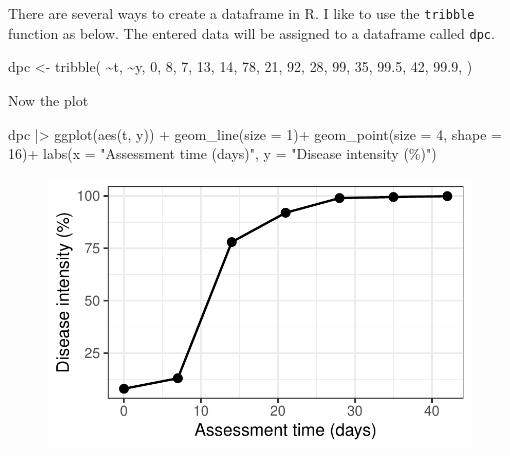 \documentclass[
  letterpaper,
  DIV=11,
  numbers=noendperiod]{scrreprt}
\newenvironment{Shaded}{\begin{snugshade}}{\end{snugshade}}
\newcommand{\AttributeTok}[1]{\textcolor[rgb]{0.40,0.45,0.13}{#1}}
\newcommand{\DecValTok}[1]{\textcolor[rgb]{0.68,0.00,0.00}{#1}}
\newcommand{\FloatTok}[1]{\textcolor[rgb]{0.68,0.00,0.00}{#1}}
\newcommand{\FunctionTok}[1]{\textcolor[rgb]{0.28,0.35,0.67}{#1}}
\newcommand{\NormalTok}[1]{\textcolor[rgb]{0.00,0.23,0.31}{#1}}
\newcommand{\OtherTok}[1]{\textcolor[rgb]{0.00,0.23,0.31}{#1}}
\newcommand{\SpecialCharTok}[1]{\textcolor[rgb]{0.37,0.37,0.37}{#1}}
\newcommand{\StringTok}[1]{\textcolor[rgb]{0.13,0.47,0.30}{#1}}
\begin{document}
There are several ways to create a dataframe in R. I like to use the
\texttt{tribble} function as below. The entered data will be assigned to
a dataframe called \texttt{dpc}.

\begin{Shaded}
\begin{Highlighting}[]
\NormalTok{dpc }\OtherTok{\textless{}{-}} 
  \FunctionTok{tribble}\NormalTok{(}
   \SpecialCharTok{\textasciitilde{}}\NormalTok{t,  }\SpecialCharTok{\textasciitilde{}}\NormalTok{y, }
   \DecValTok{0}\NormalTok{,  }\DecValTok{8}\NormalTok{, }
   \DecValTok{7}\NormalTok{,  }\DecValTok{13}\NormalTok{, }
  \DecValTok{14}\NormalTok{,  }\DecValTok{78}\NormalTok{, }
  \DecValTok{21}\NormalTok{,  }\DecValTok{92}\NormalTok{, }
  \DecValTok{28}\NormalTok{,  }\DecValTok{99}\NormalTok{, }
  \DecValTok{35}\NormalTok{, }\FloatTok{99.5}\NormalTok{, }
  \DecValTok{42}\NormalTok{, }\FloatTok{99.9}\NormalTok{, }
\NormalTok{  )}
\end{Highlighting}
\end{Shaded}

Now the plot

\begin{Shaded}
\begin{Highlighting}[]
\NormalTok{dpc }\SpecialCharTok{|\textgreater{}}
  \FunctionTok{ggplot}\NormalTok{(}\FunctionTok{aes}\NormalTok{(t, y)) }\SpecialCharTok{+}
  \FunctionTok{geom\_line}\NormalTok{(}\AttributeTok{size =} \DecValTok{1}\NormalTok{)}\SpecialCharTok{+}
  \FunctionTok{geom\_point}\NormalTok{(}\AttributeTok{size =} \DecValTok{4}\NormalTok{, }\AttributeTok{shape =} \DecValTok{16}\NormalTok{)}\SpecialCharTok{+}
  \FunctionTok{labs}\NormalTok{(}\AttributeTok{x =} \StringTok{"Assessment time (days)"}\NormalTok{,}
       \AttributeTok{y =} \StringTok{"Disease intensity (\%)"}\NormalTok{)}
\end{Highlighting}
\end{Shaded}

\begin{figure}[H]

{\centering \includegraphics{./temporal-dpc_files/figure-pdf/unnamed-chunk-6-1.pdf}

}

\end{figure}
\end{document}
